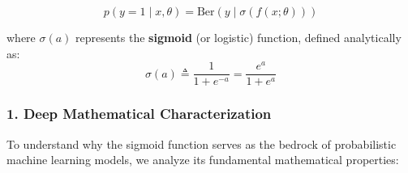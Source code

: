 \documentclass{article}
\begin{document}
\begin{equation}
    p(y=1 \mid x, \theta) = \text{Ber}(y \mid \sigma(f(x; \theta)))
\end{equation}

\noindent where $\sigma(a)$ represents the \textbf{sigmoid} (or logistic) function, defined analytically as:
\begin{equation}
    \sigma(a) \triangleq \frac{1}{1 + e^{-a}} = \frac{e^a}{1 + e^a}
\end{equation}

\subsubsection*{1. Deep Mathematical Characterization}

To understand why the sigmoid function serves as the bedrock of probabilistic machine learning models, we analyze its fundamental mathematical properties:
\end{document}
